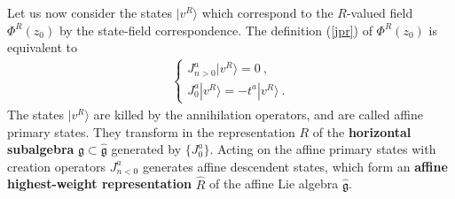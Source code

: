 \documentclass[12pt,a4paper,notitlepage]{report}
\newcommand \bla {\left\{\begin{array}{l} }
\newcommand \ela {\end{array}\right. }
\numberwithin{equation}{section}
\theoremstyle{break}
\begin{document}
Let us now consider the states $|v^R\rangle$ which correspond to the $R$-valued field $\Phi^R(z_0)$ by the state-field correspondence. The definition (\ref{jpr}) of $\Phi^R(z_0)$ is equivalent to 
\begin{align}
 \bla J^a_{n>0}|v^R\rangle = 0 \ ,  \\ J^a_0|v^R\rangle = -t^a |v^R\rangle\ . \ela
\end{align}
The states $|v^R\rangle$ are killed by the annihilation operators, and are called affine primary states. They transform in the representation $R$ of the \textbf{\boldmath horizontal subalgebra} $\mathfrak{g}\subset \hat{\mathfrak{g}}$ generated by $\{J^a_0\}$. Acting on the affine primary states with creation operators $J^a_{n<0}$ generates affine descendent states, which form an \textbf{\boldmath affine highest-weight representation} $\hat{R}$ of the affine Lie algebra $\hat{\mathfrak{g}}$.
\end{document}
